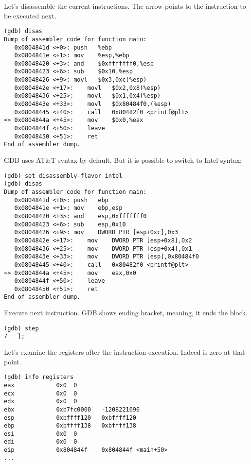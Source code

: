 Let's disassemble the current instructions.
The arrow points to the instruction to be executed next.

\begin{lstlisting}[style=customasmx86]
(gdb) disas
Dump of assembler code for function main:
   0x0804841d <+0>:	push   %ebp
   0x0804841e <+1>:	mov    %esp,%ebp
   0x08048420 <+3>:	and    $0xfffffff0,%esp
   0x08048423 <+6>:	sub    $0x10,%esp
   0x08048426 <+9>:	movl   $0x3,0xc(%esp)
   0x0804842e <+17>:	movl   $0x2,0x8(%esp)
   0x08048436 <+25>:	movl   $0x1,0x4(%esp)
   0x0804843e <+33>:	movl   $0x80484f0,(%esp)
   0x08048445 <+40>:	call   0x80482f0 <printf@plt>
=> 0x0804844a <+45>:	mov    $0x0,%eax
   0x0804844f <+50>:	leave  
   0x08048450 <+51>:	ret    
End of assembler dump.
\end{lstlisting}

\ac{GDB} uses AT\&T syntax by default.
But it is possible to switch to Intel syntax:

\begin{lstlisting}[style=customasmx86]
(gdb) set disassembly-flavor intel
(gdb) disas
Dump of assembler code for function main:
   0x0804841d <+0>:	push   ebp
   0x0804841e <+1>:	mov    ebp,esp
   0x08048420 <+3>:	and    esp,0xfffffff0
   0x08048423 <+6>:	sub    esp,0x10
   0x08048426 <+9>:	mov    DWORD PTR [esp+0xc],0x3
   0x0804842e <+17>:	mov    DWORD PTR [esp+0x8],0x2
   0x08048436 <+25>:	mov    DWORD PTR [esp+0x4],0x1
   0x0804843e <+33>:	mov    DWORD PTR [esp],0x80484f0
   0x08048445 <+40>:	call   0x80482f0 <printf@plt>
=> 0x0804844a <+45>:	mov    eax,0x0
   0x0804844f <+50>:	leave  
   0x08048450 <+51>:	ret    
End of assembler dump.
\end{lstlisting}

Execute next instruction.
\ac{GDB} shows ending bracket, meaning, it ends the block.

\begin{lstlisting}
(gdb) step
7	};
\end{lstlisting}

Let's examine the registers after the  instruction execution.
Indeed \EAX is zero at that point.

\begin{lstlisting}
(gdb) info registers
eax            0x0	0
ecx            0x0	0
edx            0x0	0
ebx            0xb7fc0000	-1208221696
esp            0xbffff120	0xbffff120
ebp            0xbffff138	0xbffff138
esi            0x0	0
edi            0x0	0
eip            0x804844f	0x804844f <main+50>
...
\end{lstlisting}

